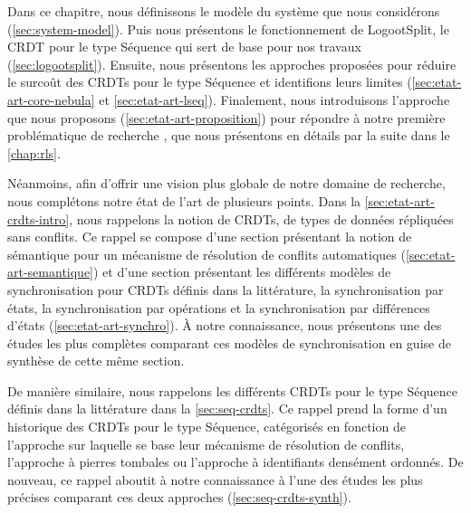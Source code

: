 Dans ce chapitre, nous définissons le modèle du système que nous considérons (\autoref{sec:system-model}).
Puis nous présentons le fonctionnement de LogootSplit, le \acf{CRDT} pour le type Séquence qui sert de base pour nos travaux (\autoref{sec:logootsplit}).
Ensuite, nous présentons les approches proposées pour réduire le surcoût des \acp{CRDT} pour le type Séquence et identifions leurs limites (\autoref{sec:etat-art-core-nebula} et \autoref{sec:etat-art-lseq}).
Finalement, nous introduisons l'approche que nous proposons (\autoref{sec:etat-art-proposition}) pour répondre à notre première problématique de recherche , que nous présentons en détails par la suite dans le \autoref{chap:rls}.

Néanmoins, afin d'offrir une vision plus globale de notre domaine de recherche, nous complétons notre état de l'art de plusieurs points.
Dans la \autoref{sec:etat-art-crdts-intro}, nous rappelons la notion de \acp{CRDT}, \ie de types de données répliquées sans conflits.
Ce rappel se compose d'une section présentant la notion de sémantique pour un mécanisme de résolution de conflits automatiques (\autoref{sec:etat-art-semantique}) et d'une section présentant les différents modèles de synchronisation pour \acp{CRDT} définis dans la littérature, \ie la synchronisation par états, la synchronisation par opérations et la synchronisation par différences d'états (\autoref{sec:etat-art-synchro}).
À notre connaissance, nous présentons une des études les plus complètes comparant ces modèles de synchronisation en guise de synthèse de cette même section.

De manière similaire, nous rappelons les différents \acp{CRDT} pour le type Séquence définis dans la littérature dans la \autoref{sec:seq-crdts}.
Ce rappel prend la forme d'un historique des \acp{CRDT} pour le type Séquence, catégorisés en fonction de l'approche sur laquelle se base leur mécanisme de résolution de conflits, \ie l'approche à pierres tombales ou l'approche à identifiants densément ordonnés.
De nouveau, ce rappel aboutit à notre connaissance à l'une des études les plus précises comparant ces deux approches (\autoref{sec:seq-crdts-synth}).
